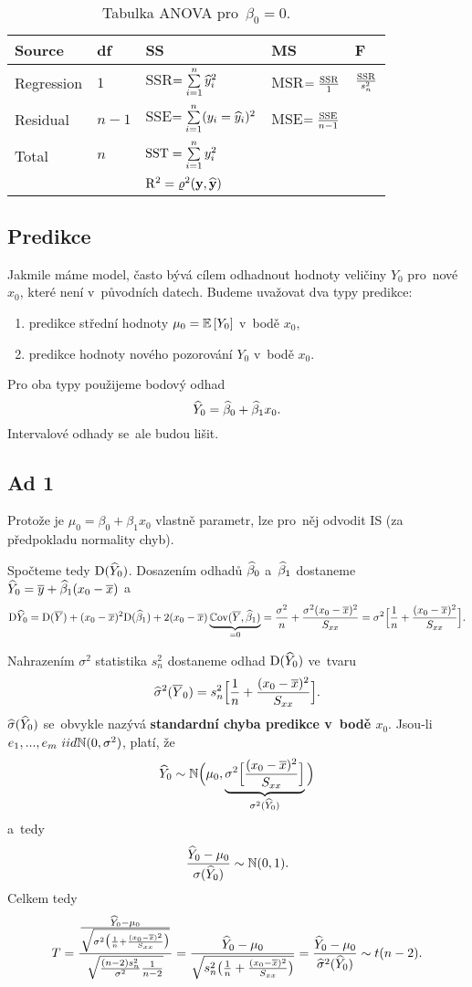\begin{table}[h]
	\begin{tabular}{lllll}
		Source & df & SS & MS & F \\
		\hline
		Regression & $1$ & SSR$=\sum\limits_{i=1}^{n} \widehat{y}_i^{2}$ & MSR$=\frac{\mathrm{SSR}}{1}$ & $\frac{\mathrm{SSR}}{s_n^{2}}$ \\
		Residual & $n-1$ & SSE$=\sum\limits_{i=1}^{n}(y_i=\widehat{y}_i)^{2}$ & MSE$=\frac{\mathrm{SSE}}{n-1}$ &  \\
		Total & $n$ & $\mathrm{SST}=\sum\limits_{i=1}^{n} y_i^{2}$ &  &  \\
		\hline
		&  & $\mathrm{R}^{2}=\varrho^{2}(\textbf{y},\widehat{\textbf{y}})$ &  &  \\
	\end{tabular}
\caption{Tabulka ANOVA pro~$\beta_0=0$.}
\end{table}

\subsection*{Predikce}
Jakmile máme model, často bývá cílem odhadnout hodnoty veličiny $Y_0$ pro~nové $x_0$, které není v~původních datech. Budeme uvažovat dva typy predikce:\begin{enumerate}
	\item predikce střední hodnoty $\mu_0=\mathbb{E}\left[ Y_0 \right]$ v~bodě $x_0$,
	\item predikce hodnoty nového pozorování $Y_0$ v~bodě $x_0$.
\end{enumerate}
Pro oba typy použijeme bodový odhad 
$$ \widehat{Y}_0=\widehat{\beta}_0+\widehat{\beta}_1 x_0.$$
Intervalové odhady se~ale budou lišit.

\subsection{Ad 1}
	Protože je $\mu_0=\beta_0+\beta_1 x_0$ vlastně parametr, lze pro~něj odvodit IS (za předpokladu normality chyb). 
	
	Spočteme tedy $\mathrm{D}(\widehat{Y}_0)$. Dosazením odhadů $\widehat{\beta}_0$ a~$\widehat{\beta}_1$ dostaneme $\widehat{Y}_0=\overline{y}+\widehat{\beta}_1(x_0-\overline{x})$ a
	$$ \mathrm{D}\widehat{Y}_0=\mathrm{D}(\overline{Y})+(x_0-\overline{x})^2\mathrm{D}(\widehat{\beta}_1)+2(x_0-\overline{x})\underbrace{\mathbb{C}\mathrm{ov}(\overline{Y},\widehat{\beta}_1)}_{=0}=\frac{\sigma^2}{n}+\frac{\sigma^2(x_0-\overline{x})^2}{S_{xx}}=\sigma^2\Big[ \frac{1}{n}+\frac{(x_0-\overline{x})^2}{S_{xx}} \Big].$$
	
	Nahrazením $\sigma^2$ statistika $s_n^2$ dostaneme odhad $\mathrm{D}(\widehat{Y}_0)$ ve~tvaru 
	$$ \widehat{\sigma}^2(\overline{Y}_0)=s_n^2\Big[ \frac{1}{n}+\frac{(x_0-\overline{x})^2}{S_{xx}} \Big].$$
	$\widehat{\sigma}(\widehat{Y}_0)$ se~obvykle nazývá \textbf{standardní chyba predikce v~bodě $x_0$}. Jsou-li $e_1,...,e_m~iid\mathbb{N}(0,\sigma^2)$, platí, že 
	$$ \widehat{Y}_0\sim\mathbb{N}\Big( \mu_0,\underbrace{\sigma^2\Big[ \frac{(x_0-\overline{x})^2}{S_{xx}} \Big]}_{\sigma^2(\widehat{Y}_0)} \Big) $$ a~tedy 
	$$ \frac{\widehat{Y}_0-\mu_0}{\sigma(\widehat{Y}_0)}\sim\mathbb{N}(0,1). $$
	Celkem tedy 
	$$ T=\frac{\frac{\widehat{Y}_0-\mu_0}{\sqrt{\sigma^2\big(\frac{1}{n}+\frac{(x_0-\overline{x})^2}{S_{xx}}\big)}}}{\sqrt{\frac{(n-2)s_n^2}{\sigma^2}\frac{1}{n-2}}}=\frac{\widehat{Y}_0-\mu_0}{\sqrt{s_n^2\big( \frac{1}{n}+\frac{(x_0-\overline{x})^2}{S_{xx}} \big)}}=\frac{\widehat{Y}_0-\mu_0}{\widehat{\sigma}^2(\widehat{Y}_0)}\sim t(n-2).$$ 
	
